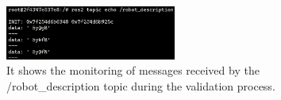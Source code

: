 \begin{figure}[ht!]
    \centering
    \includegraphics[width=0.5\textwidth]{./figures/data/ROS2_robot_description_echo.png}
    \caption{It shows the monitoring of messages received by the /robot\_description topic during the validation process.
}
    \label{fig:ROS2_robot_description_echo}
\end{figure}